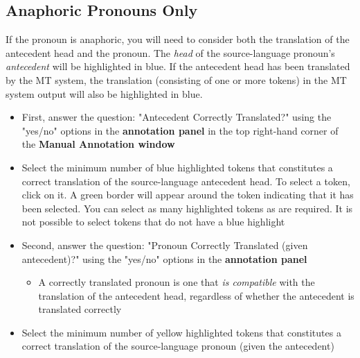 \documentclass[11pt]{article} %
\begin{document}
\subsection{Anaphoric Pronouns Only}
\label{AnaphoricGuidelines}

If the pronoun is anaphoric, you will need to consider both the translation of the antecedent head and the pronoun. The \textit{head} of the source-language pronoun's \textit{antecedent} will be highlighted in blue. If the antecedent head has been translated by the MT system, the translation (consisting of one or more tokens) in the MT system output will also be highlighted in blue.

\begin{itemize}
  \item First, answer the question: "Antecedent Correctly Translated?" using the "yes/no" options in the \textbf{annotation panel} in the top right-hand corner of the \textbf{Manual Annotation window}
  \item Select the minimum number of blue highlighted tokens that constitutes a correct translation of the source-language antecedent head. To select a token, click on it. A green border will appear around the token indicating that it has been selected. You can select as many highlighted tokens as are required. It is not possible to select tokens that do not have a blue highlight
  \item Second, answer the question: "Pronoun Correctly Translated (given antecedent)?" using the "yes/no" options in the \textbf{annotation panel}
  \begin{itemize}
    \item A correctly translated pronoun is one that \textit{is compatible} with the translation of the antecedent head, regardless of whether the antecedent is translated correctly
  \end{itemize}
  \item Select the minimum number of yellow highlighted tokens that constitutes a correct translation of the source-language pronoun (given the antecedent)
\end{itemize}
\end{document}
